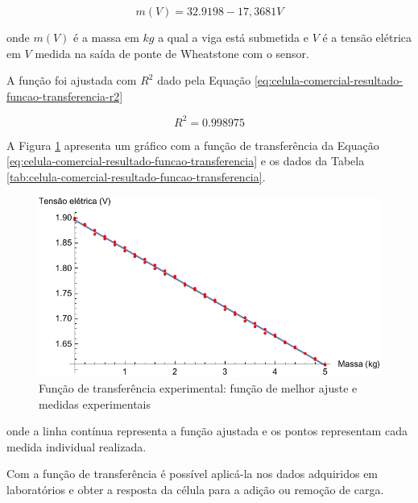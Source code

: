 \documentclass[a4paper]{instrumentacao}
\begin{document}
\begin{equation}
	m(V) = 32.9198 - 17,3681 V
	\label{eq:celula-comercial-resultado-funcao-transferencia}
\end{equation}

\noindent onde $m(V)$ é a massa em $kg$ a qual a viga está submetida e $V$ é a tensão elétrica em $V$ medida na saída de ponte de Wheatstone com o sensor.

A função foi ajustada com $R^2$ dado pela Equação \ref{eq:celula-comercial-resultado-funcao-transferencia-r2}

\begin{equation}
	R^2 = 0.998975
	\label{eq:celula-comercial-resultado-funcao-transferencia-r2}
\end{equation}


A Figura \ref{fig:celula-comercial-resultado-funcao-transferencia} apresenta um gráfico com a função de transferência da Equação \ref{eq:celula-comercial-resultado-funcao-transferencia} e os dados da Tabela \ref{tab:celula-comercial-resultado-funcao-transferencia}.

\begin{figure}[H]
\center
\includegraphics[width=\textwidth]{Comercial-Plot.pdf}
\caption{Função de transferência experimental: função de melhor ajuste e medidas experimentais}
\label{fig:celula-comercial-resultado-funcao-transferencia}
\end{figure}

\noindent onde a linha contínua representa a função ajustada e os pontos representam cada medida individual realizada.

Com a função de transferência é possível aplicá-la nos dados adquiridos em laboratórios e obter a resposta da célula para a adição ou remoção de carga.
\end{document}

